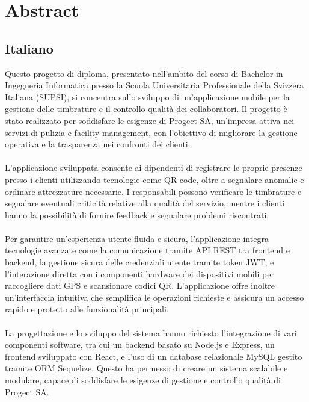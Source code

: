 \documentclass[twoside]{supsistudent}
\begin{document}
\maketitle
\onehalfspacing
\frontmatter


\tableofcontents
\listoffigures					%
\listoftables					%

\newpage
\mainmatter
{}
\setcounter{page}{1}

\chapter*{Abstract}
\section*{Italiano}
Questo progetto di diploma, presentato nell'ambito del corso di Bachelor in Ingegneria Informatica presso la Scuola Universitaria Professionale della Svizzera Italiana (SUPSI), si concentra sullo sviluppo di un'applicazione mobile per la gestione delle timbrature e il controllo qualità dei collaboratori. Il progetto è stato realizzato per soddisfare le esigenze di Progect SA, un'impresa attiva nei servizi di pulizia e facility management, con l'obiettivo di migliorare la gestione operativa e la trasparenza nei confronti dei clienti.
\\\\
L'applicazione sviluppata consente ai dipendenti di registrare le proprie presenze presso i clienti utilizzando tecnologie come QR code, oltre a segnalare anomalie e ordinare attrezzature necessarie. I responsabili possono verificare le timbrature e segnalare eventuali criticità relative alla qualità del servizio, mentre i clienti hanno la possibilità di fornire feedback e segnalare problemi riscontrati.
\\\\
Per garantire un'esperienza utente fluida e sicura, l'applicazione integra tecnologie avanzate come la comunicazione tramite API REST tra frontend e backend, la gestione sicura delle credenziali utente tramite token JWT, e l'interazione diretta con i componenti hardware dei dispositivi mobili per raccogliere dati GPS e scansionare codici QR. L'applicazione offre inoltre un'interfaccia intuitiva che semplifica le operazioni richieste e assicura un accesso rapido e protetto alle funzionalità principali.
\\\\
La progettazione e lo sviluppo del sistema hanno richiesto l'integrazione di vari componenti software, tra cui un backend basato su Node.js e Express, un frontend sviluppato con React, e l'uso di un database relazionale MySQL gestito tramite ORM Sequelize. Questo ha permesso di creare un sistema scalabile e modulare, capace di soddisfare le esigenze di gestione e controllo qualità di Progect SA.
\end{document}
